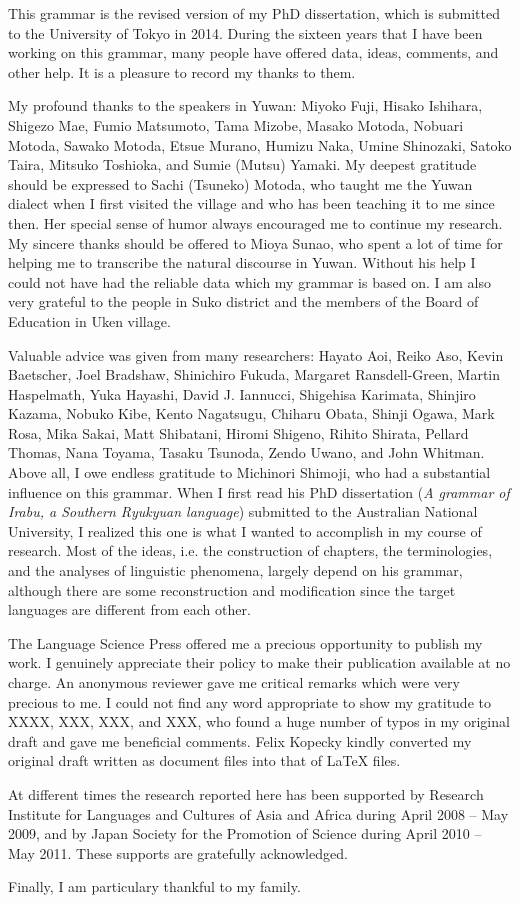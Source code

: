 \addchap{\lsAcknowledgementTitle} 
This grammar is the revised version of my PhD dissertation, which is submitted to the University of Tokyo in 2014. During the sixteen years that I have been working on this grammar, many people have offered data, ideas, comments, and other help. It is a pleasure to record my thanks to them.

My profound thanks to the speakers in Yuwan: Miyoko Fuji, Hisako Ishihara, Shigezo Mae, Fumio Matsumoto, Tama Mizobe, Masako Motoda, Nobuari Motoda, Sawako Motoda, Etsue Murano, Humizu Naka, Umine Shinozaki, Satoko Taira, Mitsuko Toshioka, and Sumie (Mutsu) Yamaki. My deepest gratitude should be expressed to Sachi (Tsuneko) Motoda, who taught me the Yuwan dialect when I first visited the village and who has been teaching it to me since then. Her special sense of humor always encouraged me to continue my research. My sincere thanks should be offered to Mioya Sunao, who spent a lot of time for helping me to transcribe the natural discourse in Yuwan. Without his help I could not have had the reliable data which my grammar is based on. I am also very grateful to the people in Suko district and the members of the Board of Education in Uken village.

Valuable advice was given from many researchers: Hayato Aoi, Reiko Aso, Kevin Baetscher, Joel Bradshaw, Shinichiro Fukuda, Margaret Ransdell-Green, Martin Haspelmath, Yuka Hayashi, David J. Iannucci, Shigehisa Karimata, Shinjiro Kazama, Nobuko Kibe, Kento Nagatsugu, Chiharu Obata, Shinji Ogawa, Mark Rosa, Mika Sakai, Matt Shibatani, Hiromi Shigeno, Rihito Shirata, Pellard Thomas, Nana Toyama, Tasaku Tsunoda, Zendo Uwano, and John Whitman. Above all, I owe endless gratitude to Michinori Shimoji, who had a substantial influence on this grammar. When I first read his PhD dissertation (\textit{A grammar of Irabu, a Southern Ryukyuan language}) submitted to the Australian National University, I realized this one is what I wanted to accomplish in my course of research. Most of the ideas, i.e. the construction of chapters, the terminologies, and the analyses of linguistic phenomena, largely depend on his grammar, although there are some reconstruction and modification since the target languages are different from each other.

The Language Science Press offered me a precious opportunity to publish my work. I genuinely appreciate their policy to make their publication available at no charge. An anonymous reviewer gave me critical remarks which were very precious to me. I could not find any word appropriate to show my gratitude to XXXX, XXX, XXX, and XXX, who found a huge number of typos in my original draft and gave me beneficial comments. Felix Kopecky kindly converted my original draft written as document files into that of LaTeX files.

At different times the research reported here has been supported by Research Institute for Languages and Cultures of Asia and Africa during April 2008 -- May 2009, and by Japan Society for the Promotion of Science during April 2010 -- May 2011. These supports are gratefully acknowledged.

Finally, I am particulary thankful to my family.
